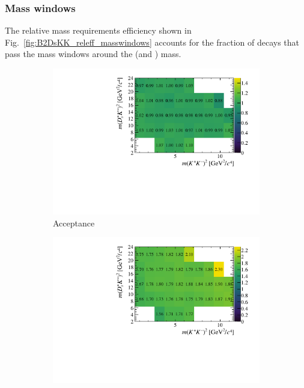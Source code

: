 \subsubsection{Mass windows} 
The relative mass requirements efficiency shown in Fig.~\ref{fig:B2DsKK_releff_masswindows} accounts for the fraction of decays that pass the mass windows around the \Dsp (and \Dzb) mass. 


\begin{figure}[!h]
    \centering
    \begin{subfigure}[t]{0.40\textwidth}
        \includegraphics[width=1.0\textwidth]{figs/B2DsKK/Relative_Eff_gen_All_Full.pdf}
        \caption{Acceptance}
        \label{fig:B2DsKK_releff_acceptance}
    \end{subfigure}
    \begin{subfigure}[t]{0.40\textwidth}
        \includegraphics[width=1.0\textwidth]{figs/B2DsKK/Relative_Eff_reco_All.pdf}

\end{subfigure}
\end{figure}
